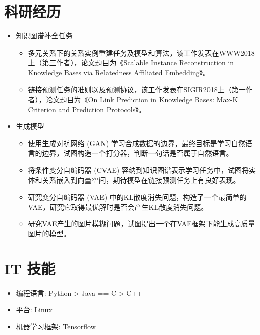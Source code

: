 \documentclass{resume}
\begin{document}

\section{科研经历}
\begin{itemize}
\item 知识图谱补全任务
\begin{itemize}
\item 多元关系下的关系实例重建任务及模型和算法，该工作发表在WWW2018上（第三作者），论文题目为《Scalable Instance Reconstruction in Knowledge Bases via Relatedness Affiliated Embedding》。
\item 链接预测任务的准则以及预测协议，该工作发表在SIGIR2018上（第一作者），论文题目为《On Link Prediction in Knowledge Bases: Max-K Criterion and Prediction Protocols》。
\end{itemize}
\item 生成模型
\begin{itemize}
\item 使用生成对抗网络 (GAN) 学习合成数据的边界，最终目标是学习自然语言的边界，试图构造一个打分器，判断一句话是否属于自然语言。
\item 将条件变分自编码器 (CVAE) 容纳到知识图谱表示学习任务中，试图将实体和关系嵌入到向量空间，期待模型在链接预测任务上有良好表现。
\item 研究变分自编码器 (VAE) 中的KL散度消失问题，构造了一个最简单的VAE，研究它取得最优解时是否会产生KL散度消失问题。
\item 研究VAE产生的图片模糊问题，试图提出一个在VAE框架下能生成高质量图片的模型。
\end{itemize}
\end{itemize}


\section{IT 技能}
\begin{itemize}[parsep=0.5ex]
  \item 编程语言: Python >  Java == C > C++
  \item 平台: Linux
  \item 机器学习框架: Tensorflow
\end{itemize}
\end{document}
